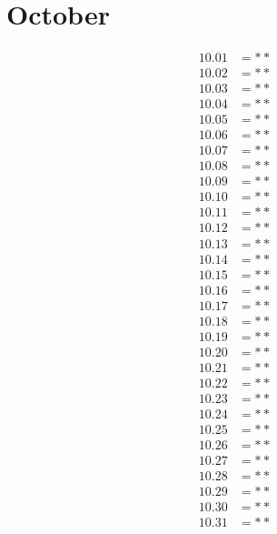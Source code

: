 \documentclass[12pt]{article}
\begin{document}
\pagebreak
 
\section{October}
\begin{align*}
10.01 &= **\\
10.02 &= **\\
10.03 &= **\\
10.04 &= **\\
10.05 &= **\\
10.06 &= **\\
10.07 &= **\\
10.08 &= **\\
10.09 &= **\\
10.10 &= **\\
10.11 &= **\\
10.12 &= **\\
10.13 &= **\\
10.14 &= **\\
10.15 &= **\\
10.16 &= **\\
10.17 &= **\\
10.18 &= **\\
10.19 &= **\\
10.20 &= **\\
10.21 &= **\\
10.22 &= **\\
10.23 &= **\\
10.24 &= **\\
10.25 &= **\\
10.26 &= **\\
10.27 &= **\\
10.28 &= **\\
10.29 &= **\\
10.30 &= **\\
10.31 &= **\\
\end{align*}

\pagebreak
 
\end{document}
